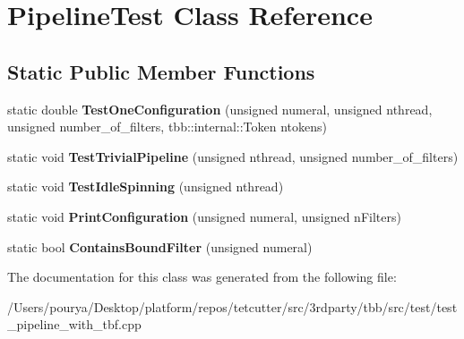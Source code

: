 \hypertarget{classPipelineTest}{}\section{Pipeline\+Test Class Reference}
\label{classPipelineTest}
\subsection*{Static Public Member Functions}
\begin{DoxyCompactItemize}
\item 
\hypertarget{classPipelineTest_ac7debdfdb7a31a646c8803025e46760a}{}static double {\bfseries Test\+One\+Configuration} (unsigned numeral, unsigned nthread, unsigned number\+\_\+of\+\_\+filters, tbb\+::internal\+::\+Token ntokens)\label{classPipelineTest_ac7debdfdb7a31a646c8803025e46760a}

\item 
\hypertarget{classPipelineTest_ac74a82ea7355a50b77011cb0db05ec45}{}static void {\bfseries Test\+Trivial\+Pipeline} (unsigned nthread, unsigned number\+\_\+of\+\_\+filters)\label{classPipelineTest_ac74a82ea7355a50b77011cb0db05ec45}

\item 
\hypertarget{classPipelineTest_ace7578027a29b405168e359bc3654a39}{}static void {\bfseries Test\+Idle\+Spinning} (unsigned nthread)\label{classPipelineTest_ace7578027a29b405168e359bc3654a39}

\item 
\hypertarget{classPipelineTest_a77818acb4952b8ef9d718c44f8c77838}{}static void {\bfseries Print\+Configuration} (unsigned numeral, unsigned n\+Filters)\label{classPipelineTest_a77818acb4952b8ef9d718c44f8c77838}

\item 
\hypertarget{classPipelineTest_a4c8db5f085d4fcdf4ce59bc620c12694}{}static bool {\bfseries Contains\+Bound\+Filter} (unsigned numeral)\label{classPipelineTest_a4c8db5f085d4fcdf4ce59bc620c12694}

\end{DoxyCompactItemize}


The documentation for this class was generated from the following file\+:\begin{DoxyCompactItemize}
\item 
/\+Users/pourya/\+Desktop/platform/repos/tetcutter/src/3rdparty/tbb/src/test/test\+\_\+pipeline\+\_\+with\+\_\+tbf.\+cpp\end{DoxyCompactItemize}
